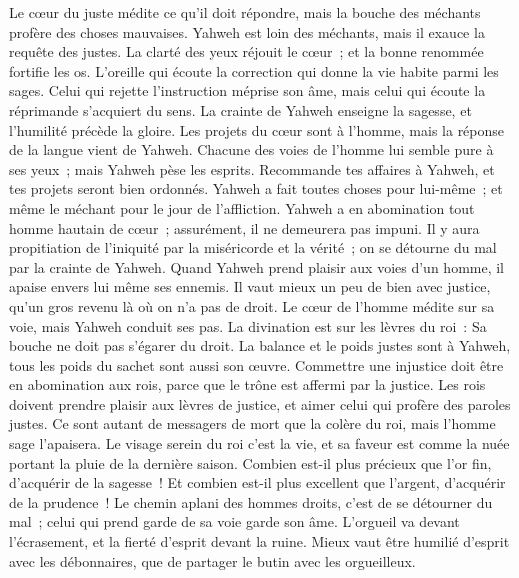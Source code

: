 \begin{multicols}{2}
Le cœur du juste médite ce qu'il doit répondre, mais la bouche des méchants profère des choses mauvaises.
Yahweh est loin des méchants, mais il exauce la requête des justes.
La clarté des yeux réjouit le cœur~; et la bonne renommée fortifie les os.
L'oreille qui écoute la correction qui donne la vie habite parmi les sages.
Celui qui rejette l'instruction méprise son âme, mais celui qui écoute la réprimande s'acquiert du sens.
La crainte de Yahweh enseigne la sagesse, et l'humilité précède la gloire.
\VerseOne{}Les projets du cœur sont à l'homme, mais la réponse de la langue vient de Yahweh.
Chacune des voies de l'homme lui semble pure à ses yeux~; mais Yahweh pèse les esprits.
Recommande tes affaires à Yahweh, et tes projets seront bien ordonnés.
Yahweh a fait toutes choses pour lui-même~; et même le méchant pour le jour de l'affliction.
Yahweh a en abomination tout homme hautain de cœur~; assurément, il ne demeurera pas impuni.
Il y aura propitiation de l'iniquité par la miséricorde et la vérité~; on se détourne du mal par la crainte de Yahweh.
Quand Yahweh prend plaisir aux voies d'un homme, il apaise envers lui même ses ennemis.
Il vaut mieux un peu de bien avec justice, qu'un gros revenu là où on n'a pas de droit.
Le cœur de l'homme médite sur sa voie, mais Yahweh conduit ses pas.
La divination est sur les lèvres du roi~: Sa bouche ne doit pas s'égarer du droit.
La balance et le poids justes sont à Yahweh, tous les poids du sachet sont aussi son œuvre.
Commettre une injustice doit être en abomination aux rois, parce que le trône est affermi par la justice.
Les rois doivent prendre plaisir aux lèvres de justice, et aimer celui qui profère des paroles justes.
Ce sont autant de messagers de mort que la colère du roi, mais l'homme sage l'apaisera.
Le visage serein du roi c'est la vie, et sa faveur est comme la nuée portant la pluie de la dernière saison.
Combien est-il plus précieux que l'or fin, d'acquérir de la sagesse~! Et combien est-il plus excellent que l'argent, d'acquérir de la prudence~!
Le chemin aplani des hommes droits, c'est de se détourner du mal~; celui qui prend garde de sa voie garde son âme.
L'orgueil va devant l'écrasement, et la fierté d'esprit devant la ruine.
Mieux vaut être humilié d'esprit avec les débonnaires, que de partager le butin avec les orgueilleux.

\end{multicols}
